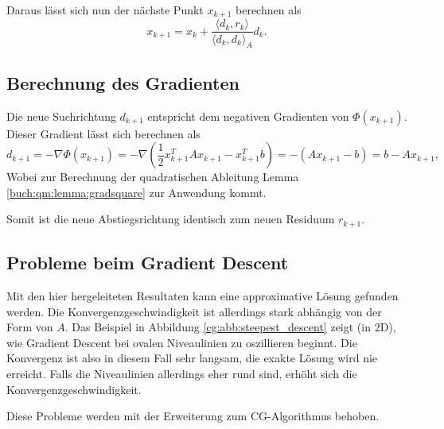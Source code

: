 Daraus lässt sich nun der nächste Punkt $x_{k+1}$ berechnen als
\begin{equation}
	x_{k+1} = x_k + \frac{\langle d_k , r_k \rangle}{\langle d_k , d_k \rangle_A} d_k.
\end{equation}

\subsection{Berechnung des Gradienten}
Die neue Suchrichtung $d_{k+1}$ entspricht dem negativen Gradienten von $\Phi(x_{k+1})$.
Dieser Gradient lässt sich berechnen als
\begin{equation}
	d_{k+1} = - \nabla \Phi(x_{k+1}) = - \nabla \left( \frac{1}{2} x_{k+1}^T A x_{k+1} - x_{k+1}^T b \right) = -(Ax_{k+1} - b) = b - Ax_{k+1},
\end{equation}
Wobei zur Berechnung der quadratischen Ableitung Lemma \ref{buch:qm:lemma:gradsquare} zur Anwendung kommt.
\begin{beobachtung} \label{cg:beob:residuum}
	Somit ist die neue Abstiegsrichtung identisch zum neuen Residuum $r_{k+1}$.
\end{beobachtung}

\subsection{Probleme beim Gradient Descent}
Mit den hier hergeleiteten Resultaten kann eine approximative Lösung gefunden werden.
Die Konvergenzgeschwindigkeit ist allerdings stark abhängig von der Form von $A$.
Das Beispiel in Abbildung \ref{cg:abb:steepest_descent} zeigt (in 2D), wie Gradient Descent bei ovalen Niveaulinien zu oszillieren beginnt.
Die Konvergenz ist also in diesem Fall sehr langsam, die exakte Lösung wird nie erreicht.
Falls die Niveaulinien allerdings eher rund sind, erhöht sich die Konvergenzgeschwindigkeit.

Diese Probleme werden mit der Erweiterung zum CG-Algorithmus behoben.

